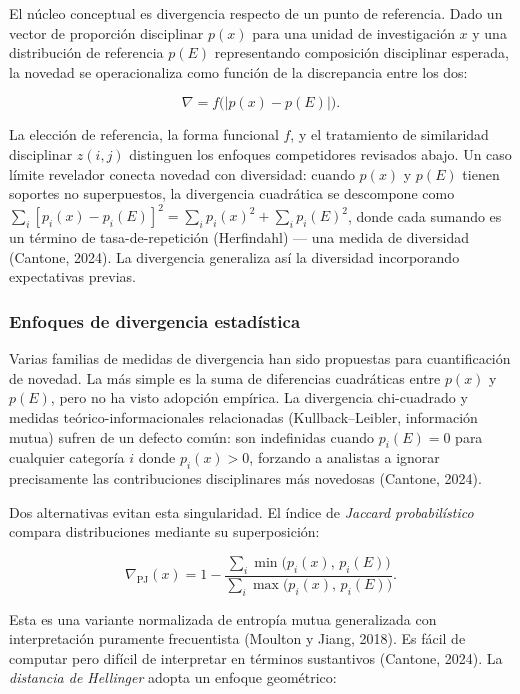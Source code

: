 \documentclass[
]{article}
\begin{document}
El núcleo conceptual es divergencia respecto de un punto de referencia.
Dado un vector de proporción disciplinar \(p(x)\) para una unidad de
investigación \(x\) y una distribución de referencia \(p(E)\)
representando composición disciplinar esperada, la novedad se
operacionaliza como función de la discrepancia entre los dos:

\[\nabla = f\!\bigl(\lvert p(x) - p(E) \rvert\bigr).\]

La elección de referencia, la forma funcional \(f\), y el tratamiento de
similaridad disciplinar \(z(i,j)\) distinguen los enfoques competidores
revisados abajo. Un caso límite revelador conecta novedad con
diversidad: cuando \(p(x)\) y \(p(E)\) tienen soportes no superpuestos,
la divergencia cuadrática se descompone como
\(\sum_i [p_i(x) - p_i(E)]^2 = \sum_i p_i(x)^2 + \sum_i p_i(E)^2\),
donde cada sumando es un término de tasa-de-repetición (Herfindahl) ---
una medida de diversidad (Cantone, 2024). La divergencia generaliza así
la diversidad incorporando expectativas previas.

\hypertarget{enfoques-de-divergencia-estaduxedstica}{%
\subsubsection{Enfoques de divergencia
estadística}\label{enfoques-de-divergencia-estaduxedstica}}

Varias familias de medidas de divergencia han sido propuestas para
cuantificación de novedad. La más simple es la suma de diferencias
cuadráticas entre \(p(x)\) y \(p(E)\), pero no ha visto adopción
empírica. La divergencia chi-cuadrado y medidas teórico-informacionales
relacionadas (Kullback--Leibler, información mutua) sufren de un defecto
común: son indefinidas cuando \(p_i(E) = 0\) para cualquier categoría
\(i\) donde \(p_i(x) > 0\), forzando a analistas a ignorar precisamente
las contribuciones disciplinares más novedosas (Cantone, 2024).

Dos alternativas evitan esta singularidad. El índice de \emph{Jaccard
probabilístico} compara distribuciones mediante su superposición:

\[\nabla_{\mathrm{PJ}}(x) = 1 - \frac{\sum_i \min\!\bigl(p_i(x),\,
p_i(E)\bigr)}{\sum_i \max\!\bigl(p_i(x),\, p_i(E)\bigr)}.\]

Esta es una variante normalizada de entropía mutua generalizada con
interpretación puramente frecuentista (Moulton y Jiang, 2018). Es fácil
de computar pero difícil de interpretar en términos sustantivos
(Cantone, 2024). La \emph{distancia de Hellinger} adopta un enfoque
geométrico:
\end{document}
